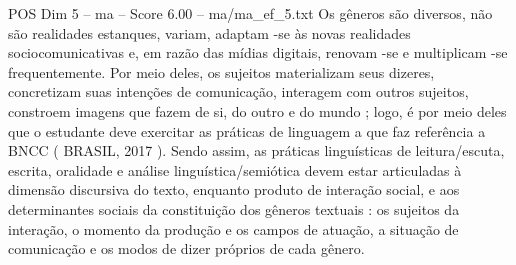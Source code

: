 \begin{textsample}{POS Dim 5 – ma – Score 6.00 – ma/ma\_ef\_5.txt}
Os gêneros são diversos, não são realidades estanques, variam, adaptam -se às novas realidades sociocomunicativas e, em razão das mídias digitais, renovam -se e multiplicam -se frequentemente.
Por meio deles, os sujeitos materializam seus dizeres, concretizam suas intenções de comunicação, interagem com outros sujeitos, constroem imagens que fazem de si, do outro e do mundo ; logo, é por meio deles que o estudante deve exercitar as práticas de linguagem a que faz referência a BNCC ( BRASIL, 2017 ).
Sendo assim, as práticas linguísticas de leitura/escuta, escrita, oralidade e análise linguística/semiótica devem estar articuladas à dimensão discursiva do texto, enquanto produto de interação social, e aos determinantes sociais da constituição dos gêneros textuais : os sujeitos da interação, o momento da produção e os campos de atuação, a situação de comunicação e os modos de dizer próprios de cada gênero.

\end{textsample}
